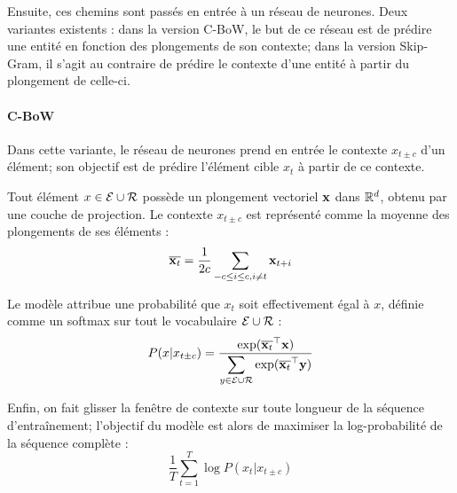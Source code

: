 
Ensuite, ces chemins sont passés en entrée à un réseau de neurones. Deux variantes existents : dans la version C-BoW, le but de ce réseau est de prédire une entité en fonction des plongements de son contexte; dans la version Skip-Gram, il s'agit au contraire de prédire le contexte d'une entité à partir du plongement de celle-ci.

\paragraph{C-BoW}

Dans cette variante, le réseau de neurones prend en entrée le contexte  $x_{t \pm c}$ d'un élément; son objectif est de prédire l'élément cible $x_t$ à partir de ce contexte.


Tout élément $x \in \Ent \cup \Rel$ possède un plongement vectoriel $\bf{x}$ dans $\R^d$, obtenu par une couche de projection. Le contexte $x_{t \pm c}$ est représenté comme la moyenne des plongements de ses éléments :
\begin{equation}
    \compconj{\bf{x}_t} = \frac{1}{2c} \sum_{-c \leq i \leq c, i \neq t} \bf{x}_{t+i}
\end{equation}

Le modèle attribue une probabilité que $x_t$ soit effectivement égal à $x$, définie comme un softmax sur tout le vocabulaire $\Ent \cup \Rel$ :
\begin{equation}
    P(x | x_{t \pm c}) = \frac{\displaystyle \exp(\compconj{\bf{x}_t}^\top \bf{x})}{\displaystyle \sum_{y \in \Ent \cup \Rel} \exp(\compconj{\bf{x}_t}^\top \bf{y})}
\end{equation}

Enfin, on fait glisser la fenêtre de contexte sur toute longueur de la séquence d'entraînement; l'objectif du modèle est alors de maximiser la log-probabilité de la séquence complète :
\begin{equation}
    \frac{1}{T} \sum_{t = 1}^{T} \log P(x_t | x_{t \pm c})
\end{equation}

